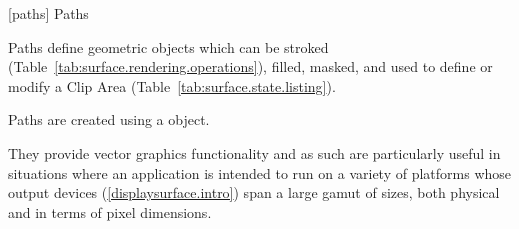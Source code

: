 
 [paths] {Paths}

\pnum
Paths define geometric objects which can be stroked (Table~\ref{tab:surface.rendering.operations}), filled, masked, and used to define or modify a Clip Area (Table~\ref{tab:surface.state.listing}).

\pnum
Paths are created using a  object.

\pnum
They provide vector graphics functionality and as such are particularly useful in situations where an application is intended to run on a variety of platforms whose output devices (\ref{displaysurface.intro}) span a large gamut of sizes, both physical and in terms of pixel dimensions.

\addtocounter{SectionDepthBase}{1}

%
%


\addtocounter{SectionDepthBase}{1}
%












%
\addtocounter{SectionDepthBase}{-1}

